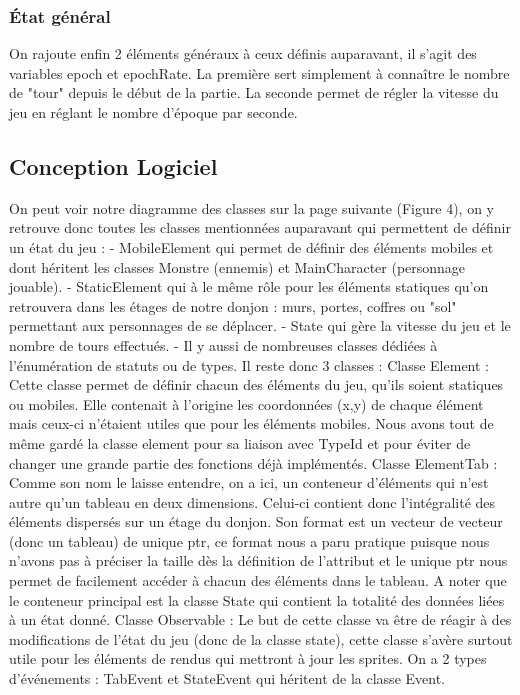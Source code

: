 \documentclass[a4paper,12pt]{article}
\begin{document}
\subsubsection{État général}

On rajoute enfin 2 éléments généraux à ceux définis auparavant, il s'agit des variables epoch et epochRate.
La première sert simplement à connaître le nombre de "tour" depuis le début de la partie. 
La seconde permet de régler la vitesse du jeu en réglant le nombre d'époque par seconde.

\subsection{Conception Logiciel}

On peut voir notre diagramme des classes sur la page suivante (Figure 4), on y retrouve donc toutes les classes mentionnées auparavant qui permettent de définir un état du jeu :
- MobileElement qui permet de définir des éléments mobiles et dont héritent les classes Monstre (ennemis) et MainCharacter (personnage jouable).
- StaticElement qui à le même rôle pour les éléments statiques qu'on retrouvera dans les étages de notre donjon : murs, portes, coffres ou "sol" permettant aux personnages de se déplacer.
- State qui gère la vitesse du jeu et le nombre de tours effectués.
- Il y aussi de nombreuses classes dédiées à l'énumération de statuts ou de types.
\bigbreak
Il reste donc 3 classes : 
\bigbreak
Classe Element : Cette classe permet de définir chacun des éléments du jeu, qu'ils soient statiques ou mobiles. Elle contenait à l'origine les coordonnées (x,y) de chaque élément mais ceux-ci n'étaient utiles que pour les éléments mobiles. Nous avons tout de même gardé la classe element pour sa liaison avec TypeId et pour éviter de changer une grande partie des fonctions déjà implémentés.
\bigbreak
Classe ElementTab :  Comme son nom le laisse entendre, on a ici, un conteneur d'éléments qui n'est autre qu'un tableau en deux dimensions. Celui-ci contient donc l'intégralité des éléments dispersés sur un étage du donjon.
Son format est un vecteur de vecteur (donc un tableau) de unique ptr, ce format nous a paru pratique puisque nous n'avons pas à préciser la taille dès la définition de l'attribut et le unique ptr nous permet de facilement accéder à chacun des éléments dans le tableau.
A noter que le conteneur principal est la classe State qui contient la totalité des données liées à un état donné.
\bigbreak
Classe Observable : Le but de cette classe va être de réagir à des modifications de l'état du jeu (donc de la classe state), cette classe s'avère surtout utile pour les éléments de rendus qui mettront à jour les sprites. On a 2 types d'événements : TabEvent et StateEvent qui héritent de la classe Event.
\end{document}
